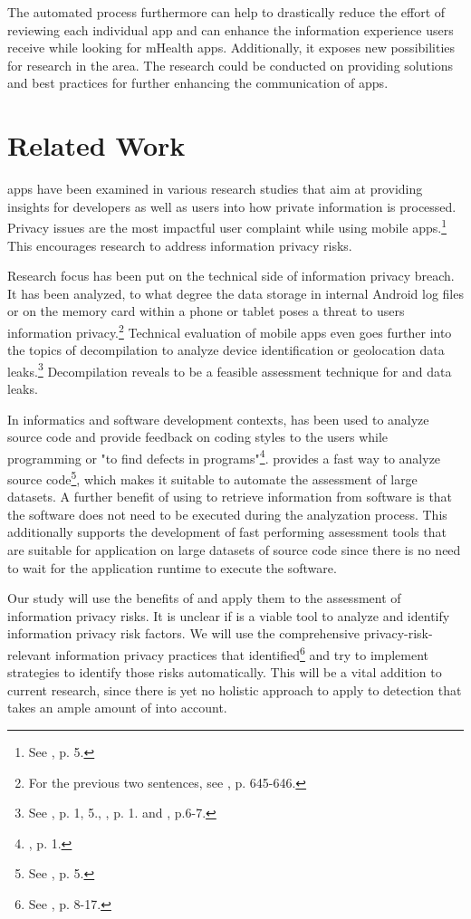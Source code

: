 \documentclass[
	a4paper,
	oneside,
	12pt,
	liststotocnumbered
]{article}
\let\cite\textcite
\begin{document}
The automated process furthermore can help to drastically reduce the effort of reviewing each individual app and can enhance the information experience users receive while looking for mHealth apps.
Additionally, it exposes new possibilities for research in the \ipr area. 
The research could be conducted on providing solutions and best practices for further enhancing the \ipr communication of apps.

\section{Related Work}
\mH apps have been examined in various research studies that aim at providing insights for developers as well as users into how private information is processed.
Privacy issues are the most impactful user complaint while using mobile apps.\footnote{See \cite{Khalid2015}, p. 5.}
This encourages research to address information privacy risks.

Research focus has been put on the technical side of information privacy breach. 
It has been analyzed, to what degree the data storage in internal Android log files or on the memory card within a phone or tablet poses a threat to users information privacy.\footnote{For the previous two sentences, see \cite{He2014}, p. 645-646.}
Technical evaluation of mobile apps even goes further into the topics of decompilation to analyze device identification or geolocation data leaks.\footnote{See \cite{Mcclurg2012}, p. 1, 5., \cite{Enck2011}, p. 1. and \cite{Mitchell2013}, p.6-7.}
Decompilation reveals to be a feasible assessment technique for \ipr and data leaks.

In informatics and software development contexts, \sca has been used to analyze source code and provide feedback on coding styles to the users  while programming or "to find defects in programs"\footnote{\cite{Bardas2010}, p. 1.}.
\Sca provides a fast way to analyze source code\footnote{See \cite{Bardas2010}, p. 5.}, which makes it suitable to automate the assessment of large datasets.
A further benefit of using \sca to retrieve information from software is that the software does not need to be executed during the analyzation process.
This additionally supports the development of fast performing assessment tools that are suitable for application on large datasets of source code since there is no need to wait for the application runtime to execute the software.

Our study will use the benefits of \sca and apply them to the assessment of \mH information privacy risks.
It is unclear if \sca is a viable tool to analyze and identify information privacy risk factors.
We will use the comprehensive privacy-risk-relevant information privacy practices that \cite{Dehling2016} identified\footnote{See \cite{Dehling2016}, p. 8-17.} and try to implement \sca strategies to identify those risks automatically.
This will be a vital addition to current research, since there is yet no holistic approach to apply \sca to \ipr detection that takes an ample amount of \iprfs into account.
\end{document}
